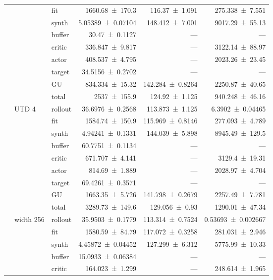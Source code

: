 {\begin{longtable}{@{}lllrrr@{}}
     &  & fit & \num{1660.68+-170.3} & \num{116.37+-1.091} & \num{275.338+-7.551} \\
     &  & synth & \num{5.05389+-0.07104} & \num{148.412+-7.001} & \num{9017.29+-55.13} \\
     &  & buffer & \num{30.47+-0.1127} & --- & --- \\
     &  & critic & \num{336.847+-9.817} & --- & \num{3122.14+-88.97} \\
     &  & actor & \num{408.537+-4.795} & --- & \num{2023.26+-23.45} \\
     &  & target & \num{34.5156+-0.2702} & --- & --- \\
     &  & GU & \num{834.334+-15.32} & \num{142.284+-0.8264} & \num{2250.87+-40.65} \\
     &  & total & \num{2537+-155.9} & \num{124.92+-1.125} & \num{940.248+-46.16} \\
    \addlinespace[2pt]
     & UTD 4 & rollout & \num{36.6976+-0.2568} & \num{113.873+-1.125} & \num{6.3902+-0.04465} \\
     &  & fit & \num{1584.74+-150.9} & \num{115.969+-0.8146} & \num{277.093+-4.789} \\
     &  & synth & \num{4.94241+-0.1331} & \num{144.039+-5.898} & \num{8945.49+-129.5} \\
     &  & buffer & \num{60.7751+-0.1134} & --- & --- \\
     &  & critic & \num{671.707+-4.141} & --- & \num{3129.4+-19.31} \\
     &  & actor & \num{814.69+-1.889} & --- & \num{2028.97+-4.704} \\
     &  & target & \num{69.4261+-0.3571} & --- & --- \\
     &  & GU & \num{1663.35+-5.726} & \num{141.798+-0.2679} & \num{2257.49+-7.781} \\
     &  & total & \num{3289.73+-149.6} & \num{129.056+-0.93} & \num{1290.01+-47.34} \\
    \addlinespace[2pt]
     & width 256 & rollout & \num{35.9503+-0.1779} & \num{113.314+-0.7524} & \num{0.53693+-0.002667} \\
     &  & fit & \num{1580.59+-84.79} & \num{117.072+-0.3258} & \num{281.031+-2.946} \\
     &  & synth & \num{4.45872+-0.04452} & \num{127.299+-6.312} & \num{5775.99+-10.33} \\
     &  & buffer & \num{15.0933+-0.06384} & --- & --- \\
     &  & critic & \num{164.023+-1.299} & --- & \num{248.614+-1.965} \\

\end{longtable}}
